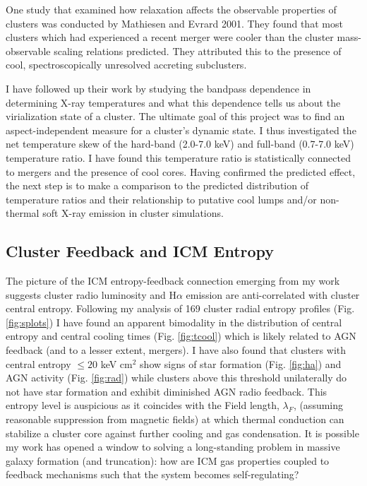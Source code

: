 \documentclass[11pt]{article}
\begin{document}
One study that examined how relaxation affects the observable
properties of clusters was conducted by Mathiesen and Evrard
2001. They found that most clusters which had experienced a recent
merger were cooler than the cluster mass-observable scaling relations
predicted. They attributed this to the presence of cool,
spectroscopically unresolved accreting subclusters.

I have followed up their work by studying the bandpass dependence in
determining X-ray temperatures and what this dependence tells us about
the virialization state of a cluster. The ultimate goal of this
project was to find an aspect-independent measure for a cluster's
dynamic state. I thus investigated the net temperature skew of the
hard-band (2.0-7.0 keV) and full-band (0.7-7.0 keV) temperature
ratio. I have found this temperature ratio is statistically connected
to mergers and the presence of cool cores. Having confirmed the
predicted effect, the next step is to make a comparison to the
predicted distribution of temperature ratios and their relationship to
putative cool lumps and/or non-thermal soft X-ray emission in cluster
simulations.

\subsection*{Cluster Feedback and ICM Entropy}

The picture of the ICM entropy-feedback connection emerging from my
work suggests cluster radio luminosity and H$\alpha$ emission are
anti-correlated with cluster central entropy. Following my analysis of 169
cluster radial entropy profiles (Fig. \ref{fig:splots}) I have found
an apparent bimodality in the distribution of central
entropy and central cooling times (Fig. \ref{fig:tcool}) which is
likely related to AGN feedback (and to a lesser extent, mergers). I
have also found that clusters with central entropy $\leq 20$ keV
cm$^2$ show signs of star formation (Fig. \ref{fig:ha}) and AGN
activity (Fig. \ref{fig:rad}) while clusters above this threshold
unilaterally do not have star formation and exhibit diminished AGN
radio feedback. This entropy level is auspicious as it coincides with
the Field length, $\lambda_F$, (assuming reasonable suppression from
magnetic fields) at which thermal conduction can stabilize a cluster
core against further cooling and gas condensation. It is possible my
work has opened a window to solving a long-standing problem in massive
galaxy formation (and truncation): how are ICM gas properties coupled
to feedback mechanisms such that the system becomes self-regulating?
\end{document}
